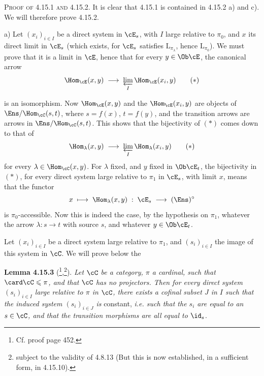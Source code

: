 \textsc{Proof of 4.15.1 and 4.15.2.} It is clear that 4.15.1 is contained in 4.15.2 a) and c). We will therefore prove 4.15.2.

a) Let $(x_i)_{i\in I}$ be a direct system in $\cE_s$, with $I$ large relative to $\pi_0$, and $x$ its direct limit in $\cE_s$ (which exists, for $\cE_s$ satisfies $\mathrm{L}_{\pi_\lambda}$, hence $\mathrm{L}_{\pi_0}$). We must prove that it is a limit in $\cE$, hence that for every $y \in \Ob\cE$, the canonical arrow
\[
\Hom_{\cE}(x,y) \;\longrightarrow\; \varprojlim_{I} \Hom_{\cE}(x_i,y) \tag*{$(*)$}
\]

is an isomorphism. Now $\Hom_{\cE}(x,y)$ and the $\Hom_{\cE}(x_i,y)$ are objects of $\Ens/\Hom_{\cC}(s,t)$, where $s = f(x)$, $t = f(y)$, and the transition arrows are arrows in $\Ens/\Hom_{\cC}(s,t)$. This shows that the bijectivity of $(*)$ comes down to that of
\[
\Hom_\lambda(x,y) \;\longrightarrow\; \varprojlim_{I} \Hom_\lambda(x_i,y) \tag*{$(*)$}
\]
for every $\lambda \in \Hom_{\cC}(x,y)$. For $\lambda$ fixed, and $y$ fixed in $\Ob\cE_t$, the bijectivity in $(*)$, for every direct system large relative to $\pi_1$ in $\cE_s$, with limit $x$, means that the functor
\[
x \;\longmapsto\; \Hom_\lambda(x,y) \;:\; \cE_s \;\longrightarrow\; (\Ens)^\circ
\]
is $\pi_0$-accessible. Now this is indeed the case, by the hypothesis on $\pi_1$, whatever the arrow $\lambda : s \longrightarrow t$ with source $s$, and whatever $y \in \Ob\cE_t$.

Let $(x_i)_{i\in I}$ be a direct system large relative to $\pi_1$, and $(s_i)_{i\in I}$ the image of this system in $\cC$. We will prove below the

\textbf{Lemma 4.15.3} (\footnote{Cf. proof page 452.},\footnote{subject to the validity of 4.8.13 (But this is now established, in a sufficient form, in 4.15.10).}). \textit{Let $\cC$ be a category, $\pi$ a cardinal, such that} $\card\cC \leqslant \pi$\textit{, and that $\cC$ has no projectors. Then for every direct system $(s_i)_{i\in I}$ large relative to $\pi$ in $\cC$, there exists a cofinal subset $J$ in $I$ such that the induced system $(s_i)_{i\in J}$ is} constant, \textit{i.e. such that the $s_i$ are equal to an $s \in \cC$, and that the transition morphisms are all equal to} $\id_s$.

